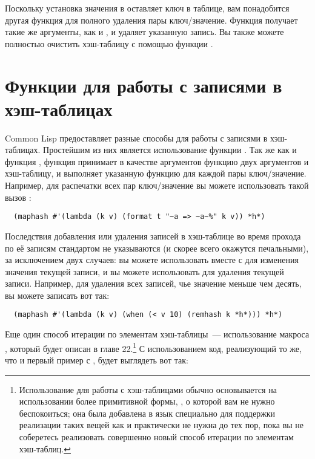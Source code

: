 Поскольку установка значения в  оставляет ключ в таблице, вам понадобится другая
функция для полного удаления пары ключ/значение.  Функция  получает такие же
аргументы, как и , и удаляет указанную запись.  Вы также можете полностью
очистить хэш-таблицу с помощью функции .


\section{Функции для работы с записями в хэш-таблицах}

Common Lisp предоставляет разные способы для работы с записями в хэш-таблицах.  Простейшим
из них является использование функции .  Так же как и функция ,
функция  принимает в качестве аргументов функцию двух аргументов и
хэш-таблицу, и выполняет указанную функцию для каждой пары ключ/значение.  Например, для
распечатки всех пар ключ/значение вы можете использовать такой вызов :

\begin{verbatim}
  (maphash #'(lambda (k v) (format t "~a => ~a~%" k v)) *h*)
\end{verbatim}

Последствия добавления или удаления записей в хэш-таблице во время прохода по её записям
стандартом не указываются (и скорее всего окажутся печальными), за исключением двух
случаев: вы можете использовать  вместе с  для изменения значения
текущей записи, и вы можете использовать  для удаления текущей записи.
Например, для удаления всех записей, чье значение меньше чем десять, вы можете записать
вот так:

\begin{verbatim}
  (maphash #'(lambda (k v) (when (< v 10) (remhash k *h*))) *h*)
\end{verbatim}

Еще один способ итерации по элементам хэш-таблицы~--- использование макроса
, который будет описан в главе 22.\footnote{Использование  для
  работы с хэш-таблицами обычно основывается на использовании более примитивной формы,
  , о которой вам не нужно беспокоиться; она была добавлена
  в язык специально для поддержки реализации таких вещей как  и практически не
  нужна до тех пор, пока вы не соберетесь реализовать совершенно новый способ итерации по
  элементам хэш-таблиц.}  С использованием  код, реализующий то же, что и первый
пример с , будет выглядеть вот так:


